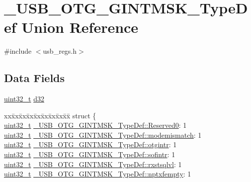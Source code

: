 \hypertarget{union___u_s_b___o_t_g___g_i_n_t_m_s_k___type_def}{\section{\-\_\-\-U\-S\-B\-\_\-\-O\-T\-G\-\_\-\-G\-I\-N\-T\-M\-S\-K\-\_\-\-Type\-Def Union Reference}
\label{union___u_s_b___o_t_g___g_i_n_t_m_s_k___type_def}
}


{\ttfamily \#include $<$usb\-\_\-regs.\-h$>$}

\subsection*{Data Fields}
\begin{DoxyCompactItemize}
\item 
\hyperlink{stdint_8h_a435d1572bf3f880d55459d9805097f62}{uint32\-\_\-t} \hyperlink{group___u_s_b___o_t_g___d_r_i_v_e_r_ga906343e7e2baec7515a156654b58d5df}{d32}
\item 
\begin{tabbing}
xx\=xx\=xx\=xx\=xx\=xx\=xx\=xx\=xx\=\kill
struct \{\\
\>\hyperlink{stdint_8h_a435d1572bf3f880d55459d9805097f62}{uint32\_t} \hyperlink{group___u_s_b___o_t_g___d_r_i_v_e_r_gae70b4c3c3e4cd67e47bffb922442b1d1}{\_USB\_OTG\_GINTMSK\_TypeDef::Reserved0}: 1\\
\>\hyperlink{stdint_8h_a435d1572bf3f880d55459d9805097f62}{uint32\_t} \hyperlink{group___u_s_b___o_t_g___d_r_i_v_e_r_ga77714304af3ece5bbc8fcd3ba715adc9}{\_USB\_OTG\_GINTMSK\_TypeDef::modemismatch}: 1\\
\>\hyperlink{stdint_8h_a435d1572bf3f880d55459d9805097f62}{uint32\_t} \hyperlink{group___u_s_b___o_t_g___d_r_i_v_e_r_ga148fbc7761867493dd8af7b29cc5e764}{\_USB\_OTG\_GINTMSK\_TypeDef::otgintr}: 1\\
\>\hyperlink{stdint_8h_a435d1572bf3f880d55459d9805097f62}{uint32\_t} \hyperlink{group___u_s_b___o_t_g___d_r_i_v_e_r_gace026c7872dc91338173935f546515a6}{\_USB\_OTG\_GINTMSK\_TypeDef::sofintr}: 1\\
\>\hyperlink{stdint_8h_a435d1572bf3f880d55459d9805097f62}{uint32\_t} \hyperlink{group___u_s_b___o_t_g___d_r_i_v_e_r_ga49f035a272eee9454d65e15275cc76ea}{\_USB\_OTG\_GINTMSK\_TypeDef::rxstsqlvl}: 1\\
\>\hyperlink{stdint_8h_a435d1572bf3f880d55459d9805097f62}{uint32\_t} \hyperlink{group___u_s_b___o_t_g___d_r_i_v_e_r_gad29b8a77aebfac3c51fd12427d726587}{\_USB\_OTG\_GINTMSK\_TypeDef::nptxfempty}: 1\\

\end{tabbing}
\end{DoxyCompactItemize}
